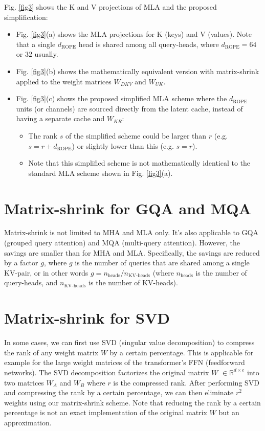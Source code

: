 \documentclass{article}
\newcommand{\eR}[2]{$\in \mathbb{R}^{#1 \times #2}$}  %
\begin{document}
Fig. \ref{fig3} shows the K and V projections of MLA and the proposed simplification:
\begin{itemize}[topsep=-1pt, itemsep=-1pt]
  \item Fig. \ref{fig3}(a) shows the MLA projections for K (keys) and V (values). Note that a single $d_\text{ROPE}$ head is shared among all query-heads, where $d_\text{ROPE} = 64$ or $32$ usually.
  \item Fig. \ref{fig3}(b) shows the mathematically equivalent version with matrix-shrink applied to the weight matrices $W_{DKV}$ and $W_{UK}$.
  \item Fig. \ref{fig3}(c) shows the proposed simplified MLA scheme where the $d_\text{ROPE}$ units (or channels) are sourced directly from the latent cache, instead of having a separate cache and $W_{KR}$:
  \begin{itemize}[topsep=-1pt, itemsep=-1pt]
    \item The rank $s$ of the simplified scheme could be larger than $r$ (e.g. $s = r + d_\text{ROPE}$) or slightly lower than this (e.g. $s = r$).
    \item Note that this simplified scheme is not mathematically identical to the standard MLA scheme shown in Fig. \ref{fig3}(a).
  \end{itemize}
\end{itemize}

\section{Matrix-shrink for GQA and MQA}
Matrix-shrink is not limited to MHA and MLA only. It’s also applicable to GQA (grouped query attention) and MQA (multi-query attention). However, the savings are smaller than for MHA and MLA. Specifically, the savings are reduced by a factor $g$, where $g$ is the number of queries that are shared among a single KV-pair, or in other words $g = n_\text{heads} / n_\text{KV-heads}$ (where $n_\text{heads}$ is the number of query-heads, and $n_\text{KV-heads}$ is the number of KV-heads).

\section{Matrix-shrink for SVD}
In some cases, we can first use SVD (singular value decomposition) to compress the rank of any weight matrix $W$ by a certain percentage. This is applicable for example for the large weight matrices of the transformer’s FFN (feedforward networks). The SVD decomposition factorizes the original matrix $W$ \eR{d}{e} into two matrices $W_A$ and $W_B$ where $r$ is the compressed rank. After performing SVD and compressing the rank by a certain percentage, we can then eliminate $r^2$ weights using our matrix-shrink scheme. Note that reducing the rank by a certain percentage is not an exact implementation of the original matrix $W$ but an approximation.
\end{document}
